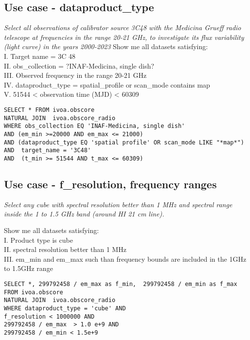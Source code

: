 \subsection{Use case - dataproduct\_type}
\textit{Select all observations of calibrator source 3C48 with the Medicina Grueff radio telescope at frequencies in the range 20-21 GHz, to investigate its flux variability (light curve) in the years 2000-2023}
Show me all datasets satisfying: \\
I. Target name = 3C 48 \\
II. obs\_collection = ?INAF-Medicina, single dish?\\
III. Observed frequency in the range 20-21 GHz \\
IV. dataproduct\_type = spatial\_profile or scan\_mode contains map\\
V. 51544 < observation time (MJD) < 60309 \\


\begin{verbatim}
SELECT * FROM ivoa.obscore
NATURAL JOIN  ivoa.obscore_radio
WHERE obs_collection EQ 'INAF-Medicina, single dish' 
AND (em_min >=20000 AND em_max <= 21000) 
AND (dataproduct_type EQ 'spatial profile' OR scan_mode LIKE "*map*") 
AND  target_name = '3C48' 
AND  (t_min >= 51544 AND t_max <= 60309)
\end{verbatim}

\subsection{Use case - f\_resolution, frequency ranges}
\label{sec:FreqRanges}

\textit{Select any cube with spectral resolution better than 1 MHz and spectral range inside the 1 to 1.5 GHz band (around HI 21 cm line).}

Show me all datasets satisfying:\\
I. Product type is cube \\
II. spectral resolution better than 1 MHz \\
III. em\_min and em\_max such than frequency bounds are included in the 1GHz to 1.5GHz range \\
\begin{verbatim}
SELECT *, 299792458 / em_max as f_min,  299792458 / em_min as f_max 
FROM ivoa.obscore 
NATURAL JOIN  ivoa.obscore_radio
WHERE dataproduct_type = 'cube' AND
f_resolution < 1000000 AND
299792458 / em_max  > 1.0 e+9 AND
299792458 / em_min < 1.5e+9
\end{verbatim}

